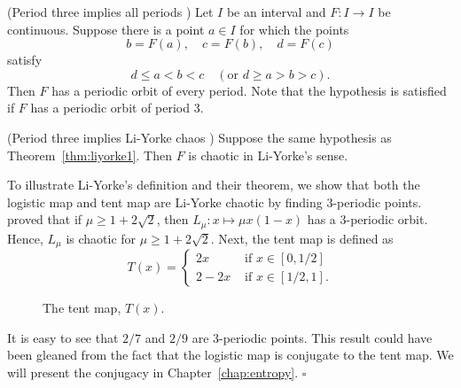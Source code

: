 \documentclass[10pt,draft,twoside]{book}
\begin{document}
\begin{theorem}
  (Period three implies all periods \citep{li-yorke})
  Let $I$ be an interval and $F: I\to I$ be continuous. Suppose there is a point $a \in I$ for which
  the points
  \begin{equation*}
  b = F(a), \quad c = F(b), \quad d = F(c)
  \end{equation*}
  satisfy
  \begin{equation*}
    d \leq a < b < c \quad(\mbox{or } d \geq a > b > c).
  \end{equation*}
  Then $F$ has a periodic orbit of every period.
  Note that the hypothesis is satisfied if $F$ has a periodic orbit of period 3.
  \label{thm:liyorke1}
\end{theorem}
\begin{theorem}
  (Period three implies Li-Yorke chaos \citep{li-yorke})
  Suppose the same hypothesis as Theorem~\ref{thm:liyorke1}.
  Then $F$ is chaotic in Li-Yorke's sense.
  \label{thm:liyorke2}
\end{theorem}
\begin{example}
  To illustrate Li-Yorke's definition and their theorem, we show that both the logistic map and tent map are Li-Yorke chaotic by finding 3-periodic points.
  \citet{saha} proved that if $\mu \geq 1 + 2\sqrt{2}$, then $L_\mu: x \mapsto \mu x(1-x)$ has a 3-periodic orbit.
  Hence, $L_\mu$ is chaotic for $\mu \geq 1 + 2\sqrt{2}$.
  Next, the tent map is defined as
  \begin{equation*}
    T(x) = 
    \begin{cases}
      2x     &\mbox{ if } x \in [0,1/2] \\
      2 - 2x &\mbox{ if } x \in [1/2,1].
    \end{cases}
  \end{equation*}

\begin{figure}[th]
  \centering
  \caption{The tent map, $T(x)$.}
\end{figure}

  It is easy to see that $2/7$ and $2/9$ are 3-periodic points.
  This result could have been gleaned from the fact that the logistic map is conjugate to the tent map.
  We will present the conjugacy in Chapter~\ref{chap:entropy}.
  $\square$
\end{example}
\end{document}

